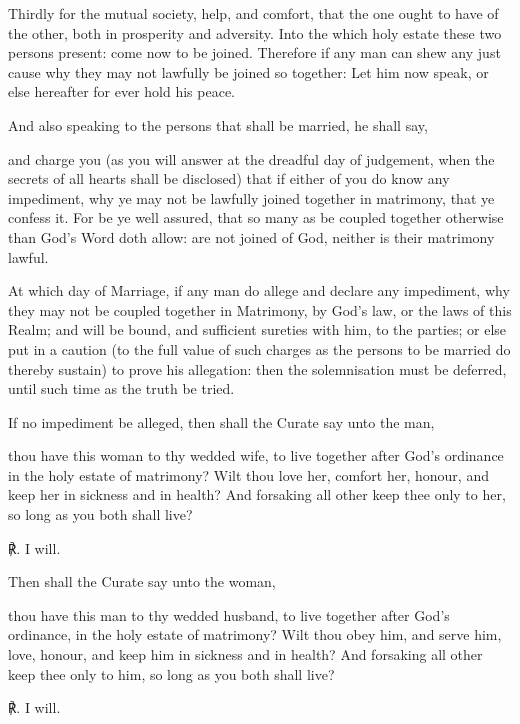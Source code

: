 Thirdly for the mutual society, help, and comfort, that the one ought to have of the other, both in prosperity and adversity. Into the which holy estate these two persons present: come now to be joined. Therefore if any man can shew any just cause why they may not lawfully be joined so together: Let him now speak, or else hereafter for ever hold his peace.
\begin{rubric}
	And also speaking to the persons that shall be married, he shall say,
\end{rubric}
 and charge you (as you will answer at the dreadful day of judgement, when the secrets of all hearts shall be disclosed) that if either of you do know any impediment, why ye may not be lawfully joined together in matrimony, that ye confess it. For be ye well assured, that so many as be coupled together otherwise than God's Word doth allow: are not joined of God, neither is their matrimony lawful.
\begin{rubric}
    At which day of Marriage, if any man do allege and declare any impediment, why they may not be coupled together in Matrimony, by God's law, or the laws of this Realm; and will be bound, and sufficient sureties with him, to the parties; or else put in a caution (to the full value of such charges as the persons to be married do thereby sustain) to prove his allegation: then the solemnisation must be deferred, until such time as the truth be tried.
\end{rubric}
\begin{rubric}
    If no impediment be alleged, then shall the Curate say unto the man,
\end{rubric}
 thou have this woman to thy wedded wife, to live together after God's ordinance in the holy estate of matrimony? Wilt thou love her, comfort her, honour, and keep her in sickness and in health? And forsaking all other keep thee only to her, so long as you both shall live?\par
℟. I will.\par
\begin{rubric}
	Then shall the Curate say unto the woman,
\end{rubric}
 thou have this man to thy wedded husband, to live together after God's ordinance, in the holy estate of matrimony? Wilt thou obey him, and serve him, love, honour, and keep him in sickness and in health? And forsaking all other keep thee only to him, so long as you both shall live?\par
℟. I will.\par
